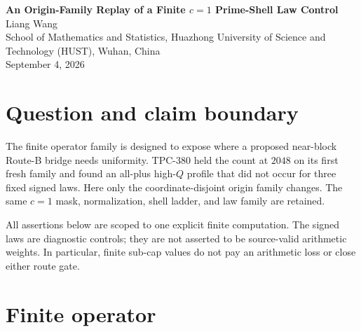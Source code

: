 \documentclass[10pt]{article}
\begin{document}
\small
\begin{center}
{\Large\bf An Origin-Family Replay of a Finite $c=1$ Prime-Shell Law Control}\\[5pt]
Liang Wang\\
School of Mathematics and Statistics, Huazhong University of Science and
Technology (HUST), Wuhan, China\\
September 4, 2026
\end{center}

\begin{abstract}
TPC-380 found that a finite high-$Q$ spectral signature of the all-plus
prime-shell law disappeared under three diagnostic signed controls.  This
paper tests the next origin-family question: does the separation survive on a
second predeclared coordinate-disjoint family at the fixed count $N=2048$?
On that fresh affine panel, the complete $3\times3\times4=36$ row experiment gives the
all-plus profile $(0,3,3)$ and the three signed-control profiles $(0,0,0)$.
There are six spectral-cap failures and no Schur-cap failures.  The result is
finite origin-family persistence with a law-dependence obstruction; it is
neither an origin/scale-uniform theorem nor a twin-prime result.
\end{abstract}

\section{Question and claim boundary}

The finite operator family is designed to expose where a proposed near-block
Route-B bridge needs uniformity.  TPC-380 held the count at $2048$ on its
first fresh family and found
an all-plus high-$Q$ profile that did not occur for three fixed signed laws.
Here only the coordinate-disjoint origin family changes.  The
same $c=1$ mask, normalization, shell ladder, and law family are retained.

All assertions below are scoped to one explicit finite computation.  The
signed laws are diagnostic controls; they are not asserted to be source-valid
arithmetic weights.  In particular, finite sub-cap values do not pay an
arithmetic loss or close either route gate.

\section{Finite operator}
\end{document}
